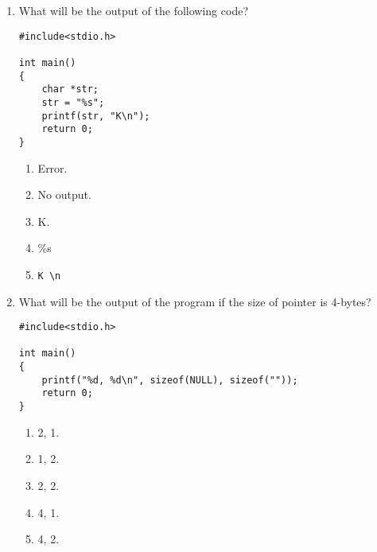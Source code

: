 \documentclass{article}
\begin{document}
\begin{enumerate}
    
\item What will be the output of the following code?

            \begin{verbatim}
#include<stdio.h>

int main()
{
    char *str;
    str = "%s";
    printf(str, "K\n");
    return 0;
}
            \end{verbatim}
    
            \begin{enumerate}
                \item Error.
                \item No output.
                \item K.
                \item \%s
                \item \begin{verbatim}K \n \end{verbatim}
            \end{enumerate}
\item What will be the output of the program if the size of pointer is 4-bytes?

            \begin{verbatim}
#include<stdio.h>

int main()
{
    printf("%d, %d\n", sizeof(NULL), sizeof(""));
    return 0;
}
            \end{verbatim}
    
            \begin{enumerate}
                \item 2, 1.
                \item 1, 2.
                \item 2, 2.
                \item 4, 1.
                \item 4, 2.
            \end{enumerate}
\end{enumerate}
\end{document}
